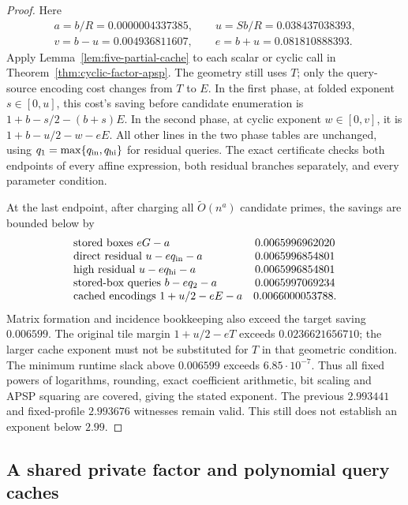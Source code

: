 \documentclass[11pt]{article}
\newcommand{\softO}{\widetilde O}
\begin{document}
\begin{proof}
Here
\[
\begin{gathered}
 a=b/R=0.0000004337385,\qquad u=Sb/R=0.038437038393,\\
 v=b-u=0.004936811607,\qquad e=b+u=0.081810888393.
\end{gathered}
\]
Apply Lemma~\ref{lem:five-partial-cache} to each scalar or cyclic call in
Theorem~\ref{thm:cyclic-factor-apsp}. The geometry still uses $T$;
only the query-source encoding cost changes from $T$ to $E$.
In the first phase, at folded exponent $s\in[0,u]$, this cost's saving
before candidate enumeration is $1+b-s/2-(b+s)E$.
In the second phase, at cyclic exponent $w\in[0,v]$, it is
$1+b-u/2-w-eE$. All other lines in the two phase tables are unchanged,
using $q_1=\max\{q_{\rm in},q_{\rm hi}\}$ for residual queries.
The exact certificate checks both endpoints of every affine expression,
both residual branches separately, and every parameter condition.

At the last endpoint, after charging all $\softO(n^a)$ candidate primes,
the savings are bounded below by
\[
\begin{array}{lc}
\text{stored boxes } eG-a &0.0065996962020\\
\text{direct residual } u-eq_{\rm in}-a &0.0065996854801\\
\text{high residual } u-eq_{\rm hi}-a &0.0065996854801\\
\text{stored-box queries } b-eq_2-a &0.0065997069234\\
\text{cached encodings } 1+u/2-eE-a &0.0066000053788.
\end{array}
\]
Matrix formation and incidence bookkeeping also exceed the target
saving $0.006599$. The original tile margin
$1+u/2-eT$ exceeds $0.0236621656710$; the larger cache exponent must not
be substituted for $T$ in that geometric condition.
The minimum runtime slack above $0.006599$ exceeds $6.85\cdot10^{-7}$.
Thus all fixed powers of logarithms, rounding, exact coefficient
arithmetic, bit scaling and APSP squaring are covered, giving the stated
exponent. The previous $2.993441$ and fixed-profile $2.993676$ witnesses
remain valid. This still does not establish an exponent below $2.99$.
\end{proof}

\subsection*{A shared private factor and polynomial query caches}
\end{document}
